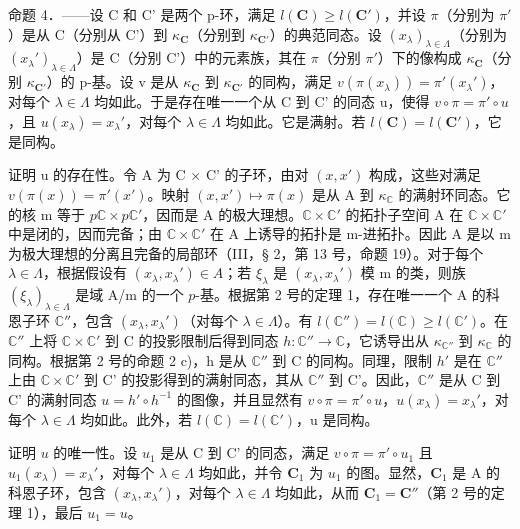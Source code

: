 命题 4．——设 C 和 C' 是两个 p-环，满足 \(l(\mathbf{C}) \geqslant l(\mathbf{C}')\)，并设 \(\pi\)（分别为 \(\pi'\)）是从 C（分别从 C'）到 \(\kappa_{\mathbf{C}}\)（分别到 \(\kappa_{\mathbf{C}'}\)）的典范同态。设 \((x_{\lambda})_{\lambda \in \Lambda}\)（分别为 \((x_{\lambda}')_{\lambda \in \Lambda}\)）是 C（分别 C'）中的元素族，其在 \(\pi\)（分别 \(\pi'\)）下的像构成 \(\kappa_{\mathbf{C}}\)（分别 \(\kappa_{\mathbf{C}'}\)）的 p-基。设 v 是从 \(\kappa_{\mathbf{C}}\) 到 \(\kappa_{\mathbf{C}'}\) 的同构，满足 \(v(\pi(x_{\lambda})) = \pi'(x_{\lambda}')\)，对每个 \(\lambda \in \Lambda\) 均如此。于是存在唯一一个从 C 到 C' 的同态 u，使得 \(v \circ \pi = \pi' \circ u\)，且 \(u(x_{\lambda}) = x_{\lambda}'\)，对每个 \(\lambda \in \Lambda\) 均如此。它是满射。若 \(l(\mathbf{C}) = l(\mathbf{C}')\)，它是同构。

证明 u 的存在性。令 A 为 C × C' 的子环，由对 \((x, x')\) 构成，这些对满足 \(v(\pi(x)) = \pi'(x')\)。映射 \((x, x') \mapsto \pi(x)\) 是从 A 到 \(\kappa_{\mathbb{C}}\) 的满射环同态。它的核 m 等于 \(p\mathbb{C} \times p\mathbb{C}'\)，因而是 A 的极大理想。\(\mathbb{C} \times \mathbb{C}'\) 的拓扑子空间 A 在 \(\mathbb{C} \times \mathbb{C}'\) 中是闭的，因而完备；由 \(\mathbb{C} \times \mathbb{C}'\) 在 A 上诱导的拓扑是 m-进拓扑。因此 A 是以 m 为极大理想的分离且完备的局部环（III，§ 2，第 13 号，命题 19）。对于每个 \(\lambda \in \Lambda\)，根据假设有 \((x_{\lambda}, x_{\lambda}') \in A\)；若 \(\xi_{\lambda}\) 是 \((x_{\lambda}, x_{\lambda}')\) 模 m 的类，则族 \((\xi_{\lambda})_{\lambda \in \Lambda}\) 是域 A/m 的一个 \(p\)-基。根据第 2 号的定理 1，存在唯一一个 A 的科恩子环 \(\mathbb{C}''\)，包含 \((x_{\lambda}, x_{\lambda}')\)（对每个 \(\lambda \in \Lambda\)）。有 \(l(\mathbb{C}'') = l(\mathbb{C}) \geqslant l(\mathbb{C}')\)。在 \(\mathbb{C}''\) 上将 \(\mathbb{C} \times \mathbb{C}'\) 到 C 的投影限制后得到同态 \(h: \mathbb{C}'' \to \mathbb{C}\)，它诱导出从 \(\kappa_{\mathbb{C}''}\) 到 \(\kappa_{\mathbb{C}}\) 的同构。根据第 2 号的命题 2 c)，h 是从 \(\mathbb{C}''\) 到 C 的同构。同理，限制 \(h'\) 是在 \(\mathbb{C}''\) 上由 \(\mathbb{C} \times \mathbb{C}'\) 到 C' 的投影得到的满射同态，其从 \(\mathbb{C}''\) 到 C'。因此，\(\mathbb{C}''\) 是从 C 到 C' 的满射同态 \(u = h' \circ h^{-1}\) 的图像，并且显然有 \(v \circ \pi = \pi' \circ u\)，\(u(x_{\lambda}) = x_{\lambda}'\)，对每个 \(\lambda \in \Lambda\) 均如此。此外，若 \(l(\mathbb{C}) = l(\mathbb{C}')\)，u 是同构。

证明 \(u\) 的唯一性。设 \(u_{1}\) 是从 C 到 C' 的同态，满足 \(v \circ \pi = \pi' \circ u_{1}\) 且 \(u_{1}(x_{\lambda}) = x_{\lambda}'\)，对每个 \(\lambda \in \Lambda\) 均如此，并令 \(\mathbf{C}_{1}\) 为 \(u_{1}\) 的图。显然，\(\mathbf{C}_{1}\) 是 A 的科恩子环，包含 \((x_{\lambda}, x_{\lambda}')\)，对每个 \(\lambda \in \Lambda\) 均如此，从而 \(\mathbf{C}_{1} = \mathbf{C}''\)（第 2 号的定理 1），最后 \(u_{1} = u\)。

